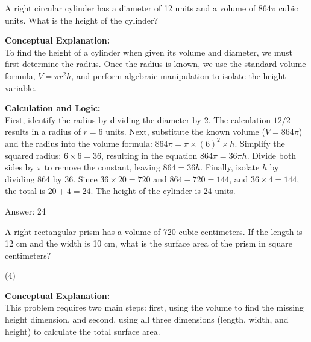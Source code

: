\documentclass[11pt,paper=a4,answers]{exam}
\begin{document}
\begin{questions}
\question
A right circular cylinder has a diameter of 12 units and a volume of $864\pi$ cubic units. What is the height of the cylinder?

\begin{solution}
\textbf{Conceptual Explanation:} \\
To find the height of a cylinder when given its volume and diameter, we must first determine the radius. Once the radius is known, we use the standard volume formula, $V = \pi r^2 h$, and perform algebraic manipulation to isolate the height variable.

\vspace{30pt}

\textbf{Calculation and Logic:} \\
First, identify the radius by dividing the diameter by 2. The calculation $12 / 2$ results in a radius of $r = 6$ units. Next, substitute the known volume ($V = 864\pi$) and the radius into the volume formula: $864\pi = \pi \times (6)^2 \times h$. Simplify the squared radius: $6 \times 6 = 36$, resulting in the equation $864\pi = 36\pi h$. Divide both sides by $\pi$ to remove the constant, leaving $864 = 36h$. Finally, isolate $h$ by dividing 864 by 36. Since $36 \times 20 = 720$ and $864 - 720 = 144$, and $36 \times 4 = 144$, the total is $20 + 4 = 24$. The height of the cylinder is 24 units.

\vspace{30pt}

Answer: \colorbox{yellow!100}{24}
\end{solution}

\vspace{60pt}

\question
A right rectangular prism has a volume of 720 cubic centimeters. If the length is 12 cm and the width is 10 cm, what is the surface area of the prism in square centimeters?
\begin{tasks}(4)
\end{tasks}

\begin{solution}
\textbf{Conceptual Explanation:} \\
This problem requires two main steps: first, using the volume to find the missing height dimension, and second, using all three dimensions (length, width, and height) to calculate the total surface area.


\end{solution}
\end{questions}
\end{document}
